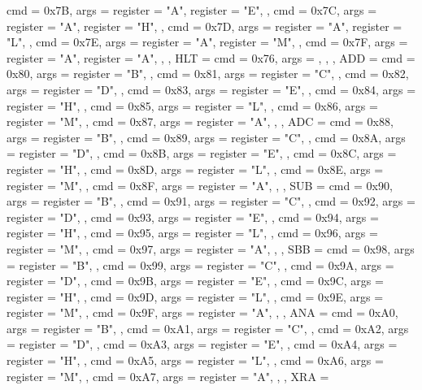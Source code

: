 {{        { cmd = 0x7B, args = {{register = "A"}, {register = "E"}}, },
        { cmd = 0x7C, args = {{register = "A"}, {register = "H"}}, },
        { cmd = 0x7D, args = {{register = "A"}, {register = "L"}}, },
        { cmd = 0x7E, args = {{register = "A"}, {register = "M"}}, },
        { cmd = 0x7F, args = {{register = "A"}, {register = "A"}}, },
    },
    HLT  = {
        {cmd = 0x76, args = {}, },
    },
    ADD  = {
        { cmd = 0x80, args = {{register = "B"}}, },
        { cmd = 0x81, args = {{register = "C"}}, },
        { cmd = 0x82, args = {{register = "D"}}, },
        { cmd = 0x83, args = {{register = "E"}}, },
        { cmd = 0x84, args = {{register = "H"}}, },
        { cmd = 0x85, args = {{register = "L"}}, },
        { cmd = 0x86, args = {{register = "M"}}, },
        { cmd = 0x87, args = {{register = "A"}}, },
    },
    ADC  = {
        { cmd = 0x88, args = {{register = "B"}}, },
        { cmd = 0x89, args = {{register = "C"}}, },
        { cmd = 0x8A, args = {{register = "D"}}, },
        { cmd = 0x8B, args = {{register = "E"}}, },
        { cmd = 0x8C, args = {{register = "H"}}, },
        { cmd = 0x8D, args = {{register = "L"}}, },
        { cmd = 0x8E, args = {{register = "M"}}, },
        { cmd = 0x8F, args = {{register = "A"}}, },
    },
    SUB  = {
        { cmd = 0x90, args = {{register = "B"}}, },
        { cmd = 0x91, args = {{register = "C"}}, },
        { cmd = 0x92, args = {{register = "D"}}, },
        { cmd = 0x93, args = {{register = "E"}}, },
        { cmd = 0x94, args = {{register = "H"}}, },
        { cmd = 0x95, args = {{register = "L"}}, },
        { cmd = 0x96, args = {{register = "M"}}, },
        { cmd = 0x97, args = {{register = "A"}}, },
    },
    SBB  = {
        { cmd = 0x98, args = {{register = "B"}}, },
        { cmd = 0x99, args = {{register = "C"}}, },
        { cmd = 0x9A, args = {{register = "D"}}, },
        { cmd = 0x9B, args = {{register = "E"}}, },
        { cmd = 0x9C, args = {{register = "H"}}, },
        { cmd = 0x9D, args = {{register = "L"}}, },
        { cmd = 0x9E, args = {{register = "M"}}, },
        { cmd = 0x9F, args = {{register = "A"}}, },
    },
    ANA  = {
        { cmd = 0xA0, args = {{register = "B"}}, },
        { cmd = 0xA1, args = {{register = "C"}}, },
        { cmd = 0xA2, args = {{register = "D"}}, },
        { cmd = 0xA3, args = {{register = "E"}}, },
        { cmd = 0xA4, args = {{register = "H"}}, },
        { cmd = 0xA5, args = {{register = "L"}}, },
        { cmd = 0xA6, args = {{register = "M"}}, },
        { cmd = 0xA7, args = {{register = "A"}}, },
    },
    XRA  = {
}}
